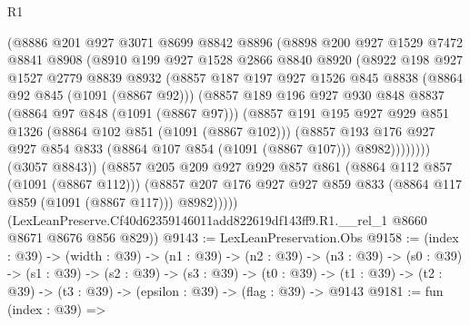 \begin{lexlean}{R1}
\begin{coremodule}
              (@8886
                @201
                @927
                @3071
                @8699
                @8842
                @8896
                (@8898
                  @200
                  @927
                  @1529
                  @7472
                  @8841
                  @8908
                  (@8910
                    @199
                    @927
                    @1528
                    @2866
                    @8840
                    @8920
                    (@8922
                      @198
                      @927
                      @1527
                      @2779
                      @8839
                      @8932
                      (@8857
                        @187
                        @197
                        @927
                        @1526
                        @845
                        @8838
                        (@8864 @92 @845 (@1091 (@8867 @92)))
                        (@8857
                          @189
                          @196
                          @927
                          @930
                          @848
                          @8837
                          (@8864 @97 @848 (@1091 (@8867 @97)))
                          (@8857
                            @191
                            @195
                            @927
                            @929
                            @851
                            @1326
                            (@8864 @102 @851 (@1091 (@8867 @102)))
                            (@8857
                              @193
                              @176
                              @927
                              @927
                              @854
                              @833
                              (@8864 @107 @854 (@1091 (@8867 @107)))
                              @8982))))))))
              (@3057 @8843))
            (@8857
              @205
              @209
              @927
              @929
              @857
              @861
              (@8864 @112 @857 (@1091 (@8867 @112)))
              (@8857 @207 @176 @927 @927 @859 @833 (@8864 @117 @859 (@1091 (@8867 @117))) @8982)))))
      (LexLeanPreserve.Cf40d62359146011add822619df143ff9.R1.__rel_1 @8660 @8671 @8676 @856 @829))
@9143 := LexLeanPreservation.Obs
@9158 := (index : @39) ->
  (width : @39) ->
  (n1 : @39) ->
  (n2 : @39) ->
  (n3 : @39) ->
  (s0 : @39) ->
  (s1 : @39) ->
  (s2 : @39) ->
  (s3 : @39) ->
  (t0 : @39) -> (t1 : @39) -> (t2 : @39) -> (t3 : @39) -> (epsilon : @39) -> (flag : @39) -> @9143
@9181 := fun (index : @39) =>

\end{coremodule}
\end{lexlean}
